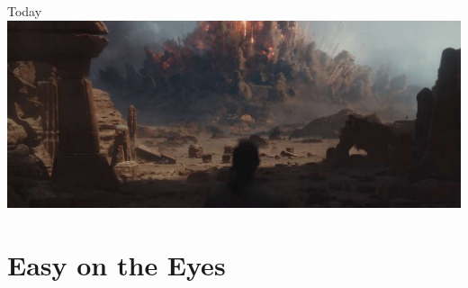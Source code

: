 \documentclass{lug}
\begin{document}
\begin{frame}{Today}
{        \includegraphics[width=\textwidth]{graphics/rogue_one_boom}
    }
\end{frame}

\section{Easy on the Eyes}
\end{document}
